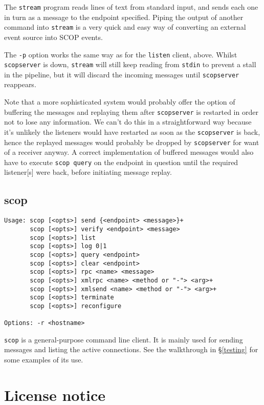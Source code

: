 \documentclass[12pt,a4paper,twoside]{article}
\renewcommand{\_}{\texttt{\symbol{95}}}
\begin{document}
The \texttt{stream} program reads lines of text from standard input,
and sends each one in turn as a message to the endpoint specified.
Piping the output of another command into \texttt{stream}
is a very quick and easy way of converting an external event source into
SCOP events.

The \texttt{-p} option works the same way as for the \texttt{listen} client,
above. Whilst \texttt{scopserver} is down, \texttt{stream} will still keep
reading from \texttt{stdin} to prevent a stall in the pipeline, but it will
discard the incoming messages until \texttt{scopserver} reappears.

Note that a more sophisticated system would probably offer the option of
buffering the messages and replaying them after \texttt{scopserver} is
restarted in order not to lose any information. We can't do this in a
straightforward way because it's unlikely the listeners would have restarted as
soon as the \texttt{scopserver} is back, hence the replayed messages would
probably be dropped by \texttt{scopserver} for want of a receiver anyway. A
correct implementation of buffered messages would also have to execute
\texttt{scop query} on the endpoint in question until the required listener[s]
were back, before initiating message replay.

\subsection{scop}

\begin{verbatim}
Usage: scop [<opts>] send {<endpoint> <message>}+
       scop [<opts>] verify <endpoint> <message>
       scop [<opts>] list
       scop [<opts>] log 0|1
       scop [<opts>] query <endpoint>
       scop [<opts>] clear <endpoint>
       scop [<opts>] rpc <name> <message>
       scop [<opts>] xmlrpc <name> <method or "-"> <arg>+
       scop [<opts>] xmlsend <name> <method or "-"> <arg>+
       scop [<opts>] terminate
       scop [<opts>] reconfigure

Options: -r <hostname>
\end{verbatim}

\texttt{scop} is a general-purpose command line client. It is
mainly used for sending messages and listing the active
connections. See the walkthrough in \S \ref{testing} for some
examples of its use.

\appendix
\section{License notice}
\end{document}
